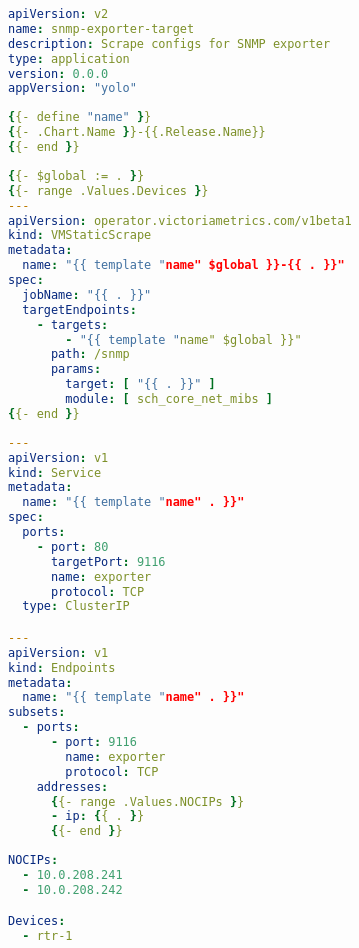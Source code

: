 \begin{lstlisting}[language=yaml,caption=./Chart.yaml]
apiVersion: v2
name: snmp-exporter-target
description: Scrape configs for SNMP exporter
type: application
version: 0.0.0
appVersion: "yolo"
\end{lstlisting}

\begin{lstlisting}[language=yaml,caption=./templates/\_helpers.tmpl]
{{- define "name" }}
{{- .Chart.Name }}-{{.Release.Name}}
{{- end }}
\end{lstlisting}

\begin{lstlisting}[language=yaml,caption=./templates/snmp-exporter.yaml]
{{- $global := . }}
{{- range .Values.Devices }}
---
apiVersion: operator.victoriametrics.com/v1beta1
kind: VMStaticScrape
metadata:
  name: "{{ template "name" $global }}-{{ . }}"
spec:
  jobName: "{{ . }}"
  targetEndpoints:
    - targets:
        - "{{ template "name" $global }}"
      path: /snmp
      params:
        target: [ "{{ . }}" ]
        module: [ sch_core_net_mibs ]
{{- end }}
\end{lstlisting}

\newpage

\begin{lstlisting}[language=yaml,caption=./templates/noc-snmp-lb.yaml]
---
apiVersion: v1
kind: Service
metadata:
  name: "{{ template "name" . }}"
spec:
  ports:
    - port: 80
      targetPort: 9116
      name: exporter
      protocol: TCP
  type: ClusterIP

---
apiVersion: v1
kind: Endpoints
metadata:
  name: "{{ template "name" . }}"
subsets:
  - ports:
      - port: 9116
        name: exporter
        protocol: TCP
    addresses:
      {{- range .Values.NOCIPs }}
      - ip: {{ . }}
      {{- end }}
\end{lstlisting}

\begin{lstlisting}[language=yaml,caption=./values.yaml]
NOCIPs:
  - 10.0.208.241
  - 10.0.208.242

Devices:
  - rtr-1
\end{lstlisting}
